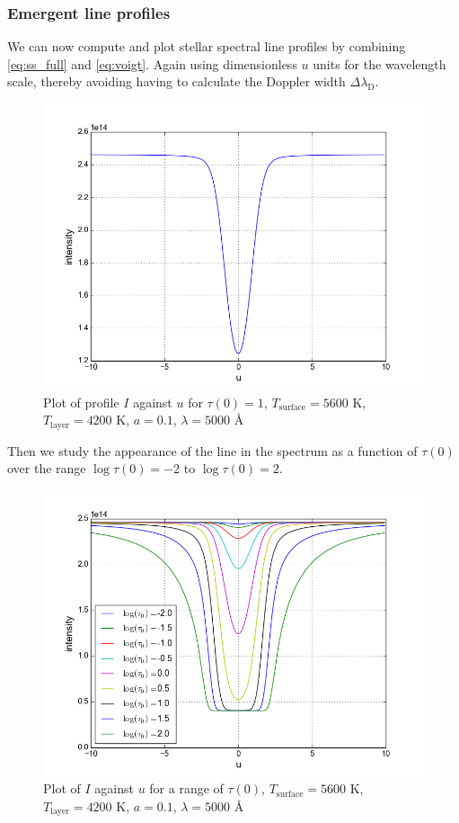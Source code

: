 \documentclass{article}
\begin{document}
\subsubsection*{Emergent line profiles}
We can now compute and plot stellar spectral line profiles by combining \eqref{eq:ss_full} and \eqref{eq:voigt}. Again using dimensionless $u$ units for the wavelength scale, thereby avoiding having to calculate the Doppler width $\Delta\lambda_{\text{D}}$.
\begin{figure}[H]
  \centering
  \includegraphics[scale=0.5]{ssa_3_3_1.png}
  \caption{Plot of profile $I$ against $u$ for $\tau(0) = 1$, $T_{\text{surface}} = 5600$ K, $T_{\text{layer}}=4200$ K, $a=0.1$, $\lambda=5000$ Å}
  \label{fig:ssa_3_3_1}
\end{figure}
Then we study the appearance of the line in the spectrum as a function of $\tau(0)$ over the range $\log\tau(0) = -2$ to $\log\tau(0) = 2$.
\begin{figure}[H]
  \centering
  \includegraphics[scale=0.5]{ssa_3_3_2.png}
  \caption{Plot of $I$ against $u$ for a range of $\tau(0)$, $T_{\text{surface}} = 5600$ K, $T_{\text{layer}}=4200$ K, $a=0.1$, $\lambda=5000$ Å}
  \label{fig:ssa_3_3_2}
\end{figure}
\end{document}
